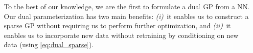 \documentclass{article}
\newcommand{\mbf}[1]{\mathbf{#1}}
\newcommand{\vw}{\mbf{w}}
\begin{document}
To the best of our knowledge, we are the first to formulate a dual GP from a NN.
Our dual parameterization has two main benefits: {\em (i)}~it enables us to construct a sparse GP without requiring us to perform further optimization, and {\em (ii)}~it enables us to incorporate new data without retraining by conditioning on new data (using \cref{eq:dual_sparse}).









\end{document}
